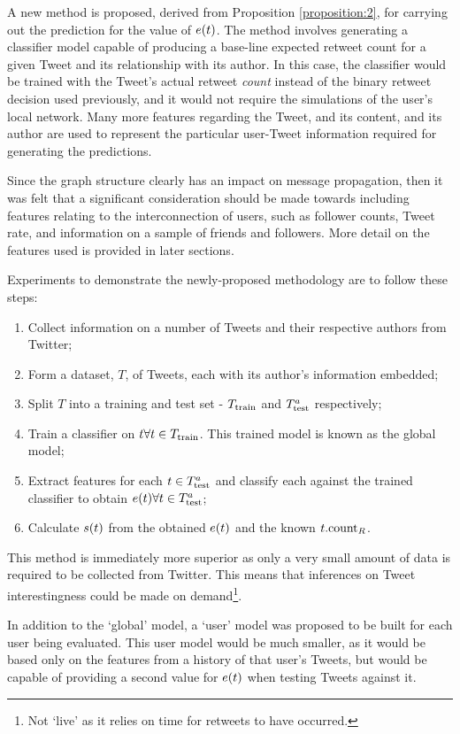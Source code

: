 A new method is proposed, derived from Proposition \ref{proposition:2}, for carrying out the prediction for the value of $e(t)$. The method involves generating a classifier model capable of producing a base-line expected retweet count for a given Tweet and its relationship with its author. In this case, the classifier would be trained with the Tweet's actual retweet \textit{count} instead of the binary retweet decision used previously, and it would not require the simulations of the user's local network. Many more features regarding the Tweet, and its content, and its author are used to represent the particular user-Tweet information required for generating the predictions.

Since the graph structure clearly has an impact on message propagation, then it was felt that a significant consideration should be made towards including features relating to the interconnection of users, such as follower counts, Tweet rate, and information on a sample of friends and followers. More detail on the features used is provided in later sections.

Experiments to demonstrate the newly-proposed methodology are to follow these steps:
\begin{enumerate}
    \item Collect information on a number of Tweets and their respective authors from Twitter;
    \item Form a dataset, $T$, of Tweets, each with its author's information embedded;
    \item Split $T$ into a training and test set - $T_{\textrm{train}}{}$ and $T^a_{\textrm{test}}{}$ respectively;
    \item Train a classifier on $t \forall t \in T_{\textrm{train}}{}$. This trained model is known as the global model;
    \item Extract features for each $t \in T^a_{\textrm{test}}{}$ and classify each against the trained classifier to obtain $e(t) \forall t \in T^a_{\textrm{test}}{}$;
    \item Calculate $s(t)$ from the obtained $e(t)$ and the known $t.\textrm{count}_R$. 
\end{enumerate}

This method is immediately more superior as only a very small amount of data is required to be collected from Twitter. This means that inferences on Tweet interestingness could be made on demand\footnote{Not `live' as it relies on time for retweets to have occurred.}.

In addition to the `global' model, a `user' model was proposed to be built for each user being evaluated. This user model would be much smaller, as it would be based only on the features from a history of that user's Tweets, but would be capable of providing a second value for $e(t)$ when testing Tweets against it. 


